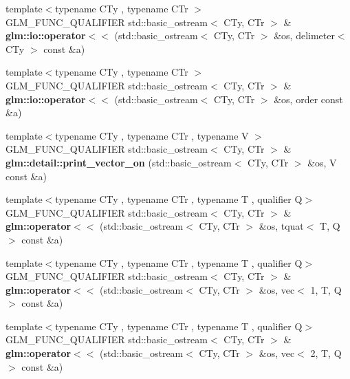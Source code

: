 \begin{DoxyCompactItemize}
\mbox{\label{io_8inl_a7c5774d5b7b03ff810042e141d893082}} 
{\footnotesize template$<$typename C\+Ty , typename C\+Tr $>$ }\\G\+L\+M\+\_\+\+F\+U\+N\+C\+\_\+\+Q\+U\+A\+L\+I\+F\+I\+ER std\+::basic\+\_\+ostream$<$ C\+Ty, C\+Tr $>$ \& {\bfseries glm\+::io\+::operator$<$$<$} (std\+::basic\+\_\+ostream$<$ C\+Ty, C\+Tr $>$ \&os, delimeter$<$ C\+Ty $>$ const \&a)
\item 
\mbox{\label{io_8inl_a4dab7c825ecbd918643ed9fc9ef4ecb6}} 
{\footnotesize template$<$typename C\+Ty , typename C\+Tr $>$ }\\G\+L\+M\+\_\+\+F\+U\+N\+C\+\_\+\+Q\+U\+A\+L\+I\+F\+I\+ER std\+::basic\+\_\+ostream$<$ C\+Ty, C\+Tr $>$ \& {\bfseries glm\+::io\+::operator$<$$<$} (std\+::basic\+\_\+ostream$<$ C\+Ty, C\+Tr $>$ \&os, order const \&a)
\item 
\mbox{\label{io_8inl_a9d760c8d2e4e01ac441fcbba7d387055}} 
{\footnotesize template$<$typename C\+Ty , typename C\+Tr , typename V $>$ }\\G\+L\+M\+\_\+\+F\+U\+N\+C\+\_\+\+Q\+U\+A\+L\+I\+F\+I\+ER std\+::basic\+\_\+ostream$<$ C\+Ty, C\+Tr $>$ \& {\bfseries glm\+::detail\+::print\+\_\+vector\+\_\+on} (std\+::basic\+\_\+ostream$<$ C\+Ty, C\+Tr $>$ \&os, V const \&a)
\item 
{\footnotesize template$<$typename C\+Ty , typename C\+Tr , typename T , qualifier Q$>$ }\\G\+L\+M\+\_\+\+F\+U\+N\+C\+\_\+\+Q\+U\+A\+L\+I\+F\+I\+ER std\+::basic\+\_\+ostream$<$ C\+Ty, C\+Tr $>$ \& {\bfseries glm\+::operator$<$$<$} (std\+::basic\+\_\+ostream$<$ C\+Ty, C\+Tr $>$ \&os, tquat$<$ T, Q $>$ const \&a)
\item 
{\footnotesize template$<$typename C\+Ty , typename C\+Tr , typename T , qualifier Q$>$ }\\G\+L\+M\+\_\+\+F\+U\+N\+C\+\_\+\+Q\+U\+A\+L\+I\+F\+I\+ER std\+::basic\+\_\+ostream$<$ C\+Ty, C\+Tr $>$ \& {\bfseries glm\+::operator$<$$<$} (std\+::basic\+\_\+ostream$<$ C\+Ty, C\+Tr $>$ \&os, vec$<$ 1, T, Q $>$ const \&a)
\item 
{\footnotesize template$<$typename C\+Ty , typename C\+Tr , typename T , qualifier Q$>$ }\\G\+L\+M\+\_\+\+F\+U\+N\+C\+\_\+\+Q\+U\+A\+L\+I\+F\+I\+ER std\+::basic\+\_\+ostream$<$ C\+Ty, C\+Tr $>$ \& {\bfseries glm\+::operator$<$$<$} (std\+::basic\+\_\+ostream$<$ C\+Ty, C\+Tr $>$ \&os, vec$<$ 2, T, Q $>$ const \&a)

\end{DoxyCompactItemize}
